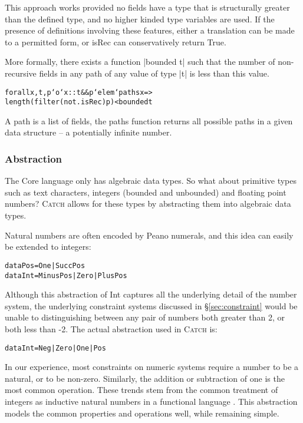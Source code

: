 \documentclass[preprint]{sigplanconf}
\newcommand{\C}[1]{\textsf{#1}}
\newcommand{\catch}{\textsc{Catch}}
\newenvironment{code}{\begin{alltt}\small}{\end{alltt}}
\begin{document}
This approach works provided no fields have a type that is structurally greater than the defined type, and no higher kinded type variables are used. If the presence of definitions involving these features, either a translation can be made to a permitted form, or \C{isRec} can conservatively return True.

More formally, there exists a function |bounded t| such that the number of non-recursive fields in any path of any value of type |t| is less than this value.

\begin{code}
forall x,t,p `o`  x :: t && p `elem` paths x =>
                  length (filter (not . isRec) p) < bounded t
\end{code}

A path is a list of fields, the \C{paths} function returns all possible paths in a given data structure -- a potentially infinite number.

\subsubsection{Abstraction}
\label{sec:abstraction}

The Core language only has algebraic data types. So what about primitive types such as text characters, integers (bounded and unbounded) and floating point numbers? \catch{} allows for these types by abstracting them into algebraic data types.

Natural numbers are often encoded by Peano numerals, and this idea can easily be extended to integers:

\begin{code}
data Pos  = One | Succ Pos
data Int  = Minus Pos | Zero | Plus Pos
\end{code}

Although this abstraction of \C{Int} captures all the underlying detail of the number system, the underlying constraint systems discussed in \S\ref{sec:constraint} would be unable to distinguishing between any pair of numbers both greater than 2, or both less than -2. The actual abstraction used in \catch{} is:

\begin{code}
data Int = Neg | Zero | One | Pos
\end{code}

In our experience, most constraints on numeric systems require a number to be a natural, or to be non-zero. Similarly, the addition or subtraction of one is the most common operation. These trends stem from the common treatment of integers as inductive natural numbers in a functional language \citep{runciman:naturals}. This abstraction models the common properties and operations well, while remaining simple.
\end{document}
